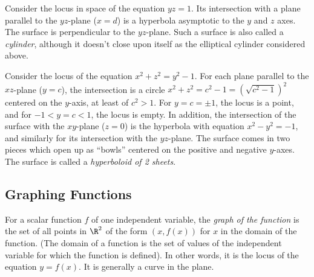 \begin{example}
	Consider the locus in space of the equation $yz = 1$.   Its intersection
	with a plane parallel to the $yz$-plane ($x = d$) is a hyperbola
	asymptotic to the $y$ and $z$ axes.  The surface is perpendicular
	to the $yz$-plane.  Such a surface is also called a \emph{cylinder},
	although it doesn't close upon itself as the elliptical cylinder considered
	above.
\end{example}

\begin{example}
	Consider the locus of the equation $x^2 + z^2 = y^2 - 1$.  For
	each plane parallel to the $xz$-plane ($y = c$), the intersection
	is a circle $x^2 + z^2 = c^2 - 1 = \left(\sqrt{c^2 - 1}\right)^2$ centered
	on the $y$-axis, at least of $c^2 > 1$.  For $y = c = \pm 1$,
	the locus is a point, and for $-1 < y = c < 1$, the locus is
	empty.   In addition, the intersection of the surface with the
	$xy$-plane ($z = 0$) is the hyperbola with equation $x^2 - y^2
	 = -1$, and similarly for its intersection with the $yz$-plane.
	The surface comes in two pieces which open up as ``bowls'' centered
	on the positive and negative $y$-axes.   The surface is called
	a \emph{hyperboloid of 2 sheets}.    
	
	\begin{center}
	\end{center}
\end{example}

\subsection{Graphing Functions}
For a scalar function $f$ of one independent variable, 
the \emph{graph of the function} is the set of
all points in $\R^2$  of the form  $(x, f(x))$
for $x$ in the domain of the function.   (The domain of a function
is the set of values of the independent variable for which the
function is defined).  In other words, it is the locus of the
equation $y = f(x)$.  It is generally a curve in the plane.


